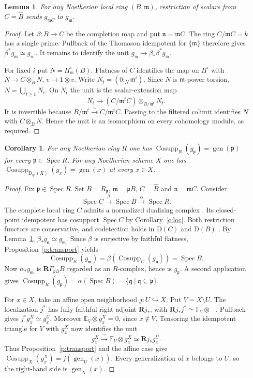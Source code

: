 \documentclass[11pt,reqno]{amsart}
\newtheorem{corollary}[theorem]{Corollary}
\newtheorem{lemma}[theorem]{Lemma}
\theoremstyle{definition}
\DeclareMathOperator{\Cosupp}{Cosupp}
\DeclareMathOperator{\gen}{gen}
\DeclareMathOperator{\Spec}{Spec}
\newcommand{\D}{\mathrm D}
\newcommand{\p}{\mathfrak p}
\newcommand{\q}{\mathfrak q}
\newcommand{\m}{\mathfrak m}
\newcommand{\RG}{\mathbf R\Gamma}
\newcommand{\qc}{\mathrm{qc}}
\numberwithin{equation}{section}
\begin{document}
\begin{lemma}\label{l:comp}
For any Noetherian local ring $(B,\m)$, restriction of scalars from $C=\widehat B$ sends $g_{\m C}$ to $g_{\m}$.
\end{lemma}
\begin{proof}
Let $\beta:B\to C$ be the completion map and put $\mathfrak n=\m C$. The ring $C/\m C=k$ has a single prime. Pullback of the Thomason idempotent for $\{\m\}$ therefore gives $\beta^*g_{\m}\simeq g_{\mathfrak n}$ \cite[Corollary~7.5]{bf}. It remains to identify the unit $g_{\m}\to\beta_*\beta^*g_{\m}$.

For fixed $i$ put $N=H^i_{\m}(B)$. Flatness of $C$ identifies the map on $H^i$ with $N\to C\otimes_B N$, $v\mapsto1\otimes v$. Write $N_t=(0:_N\m^t)$. Since $N$ is $\m$-power torsion, $N=\bigcup_{t\ge1}N_t$. On $N_t$ the unit is the scalar-extension map
\[
 N_t\longrightarrow (C/\m^t C)\otimes_{B/\m^t}N_t.
\]
It is invertible because $B/\m^t\xrightarrow{\sim}C/\m^tC$. Passing to the filtered colimit identifies $N$ with $C\otimes_B N$. Hence the unit is an isomorphism on every cohomology module, as required.
\end{proof}

\begin{corollary}\label{c:sch}
For any Noetherian ring $R$ one has $\Cosupp_R(g_{\p})=\gen(\p)$ for every $\p\in\Spec R$. For any Noetherian scheme $X$ one has $\Cosupp_{\D_{\qc}(X)}(g_x)=\gen(x)$ at every $x\in X$.
\end{corollary}
\begin{proof}
Fix $\p\in\Spec R$. Set $B=R_{\p}$, $\m=\p B$, $C=\widehat B$ and $\mathfrak n=\m C$. Consider
\[
 \Spec C\xrightarrow{\beta}\Spec B\xrightarrow{\alpha}\Spec R.
\]
The complete local ring $C$ admits a normalized dualizing complex \cite[Section~47.22]{stacks}. Its closed-point idempotent has cosupport $\Spec C$ by Corollary~\ref{c:loc}. Both restriction functors are conservative, and codetection holds in $\D(C)$ and $\D(B)$ \cite[Example~19.2]{bchs}. By Lemma~\ref{l:comp}, $\beta_*g_{\mathfrak n}\simeq g_{\m}$. Since $\beta$ is surjective by faithful flatness, Proposition~\ref{p:transport} yields
\[
 \Cosupp_B(g_{\m})=\beta(\Cosupp_C(g_{\mathfrak n}))=\Spec B .
\]
Now $\alpha_*g_{\m}$ is $\RG_{\p B}B$ regarded as an $R$-complex, hence is $g_{\p}$. A second application gives $\Cosupp_R(g_{\p})=\alpha(\Spec B)=\{\q\mid\q\subseteq\p\}$.

For $x\in X$, take an affine open neighborhood $j:U\hookrightarrow X$. Put $V=X\setminus U$. The localization $j^*$ has fully faithful right adjoint $\mathbf Rj_*$, with $\mathbf Rj_*j^*\simeq\mathbb F_V\otimes-$. Pullback gives $j^*g_x^X\simeq g_x^U$. Moreover $\mathbb E_V\otimes g_x^X=0$, since $x\notin V$. Tensoring the idempotent triangle for $V$ with $g_x^X$ now identifies the unit
\[
 g_x^X\xrightarrow{\ \sim\ }\mathbb F_V\otimes g_x^X
             \simeq\mathbf Rj_*g_x^U .
\]
Thus Proposition~\ref{p:transport} and the affine case give $\Cosupp_X(g_x^X)=j(\gen_U(x))$. Every generalization of $x$ belongs to $U$, so the right-hand side is $\gen_X(x)$.
\end{proof}
\end{document}
